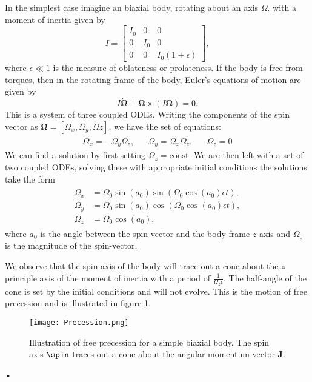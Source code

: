 In the simplest case imagine an biaxial body,
rotating about an axis $\Omega$. with a moment of inertia given by
\begin{equation}
    I = \left[\begin{array}{ccc}
            I_{0} & 0 & 0 \\
            0 & I_{0} & 0 \\
            0 & 0 & I_{0}(1 + \epsilon)
            \end{array}\right],
\end{equation}
where $\epsilon \ll 1$ is the measure of oblateness or prolateness.  If the
body is free from torques, then in the rotating frame of the body, Euler's
equations of motion \citep{1969} are given by
\begin{equation}
    I\dot{\bm{\Omega}} + \bm{\Omega} \times \left(I\bm{\Omega}\right)=0.
\end{equation}
This is a system of three coupled ODEs. Writing the components of the spin
vector as $\bm{\Omega} = [\Omega_{x}, \Omega_{y}, \Omega{z}]$, we have the
set of equations:
\begin{align}
\dot{\Omega}_x = -\Omega_y\Omega_z, &&
\dot{\Omega}_y = \Omega_x \Omega_z, &&
\dot{\Omega}_z = 0
\end{align}
We can find a solution by first setting $\Omega_{z}=\mathrm{const}$.
We are then left with a set of
two coupled ODEs, solving these with appropriate initial conditions
the solutions take the form
\begin{align}
\begin{split}
    \Omega_{x} & = \Omega_{0}\sin(a_0)\sin\left(\Omega_{0}\cos(a_0)\epsilon t\right), \\
    \Omega_{y} & = \Omega_{0}\sin(a_0)\cos\left(\Omega_{0}\cos(a_0)\epsilon t\right),\\
    \Omega_{z} & = \Omega_0 \cos(a_0),
\end{split}
\end{align}
where $a_0$ is the angle between the spin-vector and the body frame $z$ axis and
$\Omega_0$ is the magnitude of the spin-vector.

We observe that the spin axis of the body will trace out a cone about the $z$
principle axis of the moment of inertia with a period of
$\frac{1}{\Omega_{z}\epsilon}$.  The half-angle of the cone is set by the
initial conditions and will not evolve. This is the motion of free precession
and is illustrated in figure \ref{fig: precession}.
\begin{figure}[htb]
\centering
\texttt{[image: Precession.png]}
\caption{Illustration of free precession for a simple biaxial body. The spin
    axis $\spin$ traces out a cone about the angular momentum vector $\mathbf{J}$.}
\label{fig: precession}
\end{figure}•

